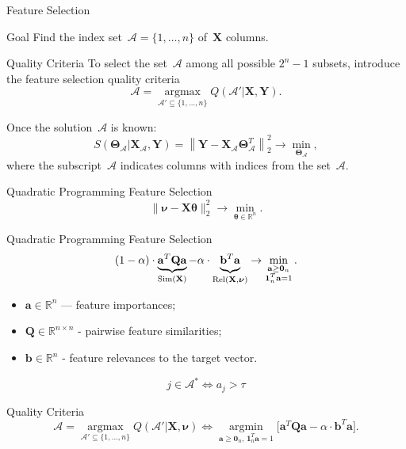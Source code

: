 \documentclass[9pt]{beamer}
\newcommand{\ba}{\mathbf{a}}
\newcommand{\bY}{\mathbf{Y}}
\newcommand{\bX}{\mathbf{X}}
\newcommand{\bQ}{\mathbf{Q}}
\newcommand{\bbR}{\mathbb{R}}
\newcommand{\cA}{\mathcal{A}}
\newcommand{\bnu}{\boldsymbol{\nu}}
\newcommand{\bOne}{\boldsymbol{1}}
\newcommand{\bZero}{\boldsymbol{0}}
\newcommand{\btheta}{\boldsymbol{\theta}}
\newcommand{\bTheta}{\boldsymbol{\Theta}}
\newcommand{\argmin}{\mathop{\arg \min}\limits}
\newcommand{\argmax}{\mathop{\arg \max}\limits}
\begin{document}
\begin{frame}{Feature Selection}
\begin{block}{Goal}
Find the index set~$\cA = \{1, \dots, n\}$ of~$\bX$ columns. 
\end{block}
\begin{block}{Quality Criteria}
To select the set~$\cA$ among all possible $2^n - 1$ subsets, introduce the feature selection quality criteria
\[
\cA = \argmax_{\cA' \subseteq \{1, \dots, n\}} Q(\cA' | \bX, \bY).
\label{eq:subset_selection}
\]
\end{block}
Once the solution~$\cA$ is known:
\[
S(\bTheta_{\cA} | \bX_{\cA}, \bY) = {\left\| \mathbf{Y} - \bX_{\cA}\bTheta^T_{\cA} \right\| }_2^2 \rightarrow\min_{\bTheta_{\cA}},
\]
where the subscript~$\cA$ indicates columns with indices from the set~$\cA$.

\end{frame}
\begin{frame}{Quadratic Programming Feature Selection}
	\[
	\| \bnu - \bX \btheta\|_2^2 \rightarrow\min_{\btheta \in \bbR^{n}}.
	\]
	\begin{block}{Quadratic Programming Feature Selection}
	\vspace{-0.3cm}
	\[
	(1 - \alpha) \cdot \underbrace{\ba^{T} \bQ \ba}_{\text{Sim}(\bX)} - \alpha \cdot \underbrace{\vphantom{()} \mathbf{b}^{T} \ba}_{\text{Rel}(\bX, \bnu)} \rightarrow \min_{\substack{\ba \geq \bZero_n \\ \bOne_n^T \ba=1}}.
	\]
	\vspace{-0.3cm}
	\end{block}
		\begin{itemize}
			\item $\ba \in \bbR^n$ --- feature importances;
			\item $\bQ \in \bbR^{n \times n}$ - pairwise feature similarities;
			\item $\mathbf{b} \in \bbR^n$ - feature relevances to the target vector.
		\end{itemize}
	
	\begin{equation*}
	j \in \mathcal{A}^* \Leftrightarrow a_j > \tau
	\end{equation*}
	
	\begin{block}{Quality Criteria}
	\[
	\cA = \argmax_{\cA' \subseteq \{1, \dots, n\}} Q(\cA' | \bX, \bnu) \Leftrightarrow \argmin_{\ba \geq \bZero_n, \, \bOne_n^T\ba=1} \bigl[\ba^{T} \bQ \ba - \alpha \cdot \mathbf{b}^{T} \ba \bigr].
	\]
	\end{block}
\end{frame}
\end{document}
